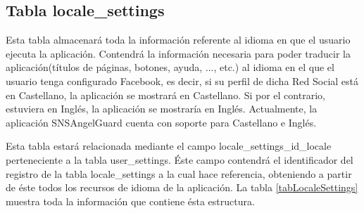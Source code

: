 \subsection{Tabla locale\_settings}
Esta tabla almacenará toda la información referente al idioma en que el usuario ejecuta la aplicación. Contendrá la información necesaria para poder traducir la aplicación(títulos de páginas, botones, ayuda, ..., etc.) al idioma en el que el usuario tenga configurado Facebook, es decir, si su perfil de dicha Red Social está en Castellano, la aplicación se mostrará en Castellano. Si por el contrario, estuviera en Inglés, la aplicación se mostraría en Inglés. Actualmente, la aplicación SNSAngelGuard cuenta con soporte para Castellano e Inglés. 
\bigskip
\par
Esta tabla estará relacionada mediante el campo locale\_settings\_id\_locale perteneciente a la tabla user\_settings. Éste campo contendrá el identificador del registro de la tabla locale\_settings a la cual hace referencia, obteniendo a partir de éste todos los recursos de idioma de la aplicación. La tabla \ref{tabLocaleSettings} muestra toda la información que contiene ésta estructura.

